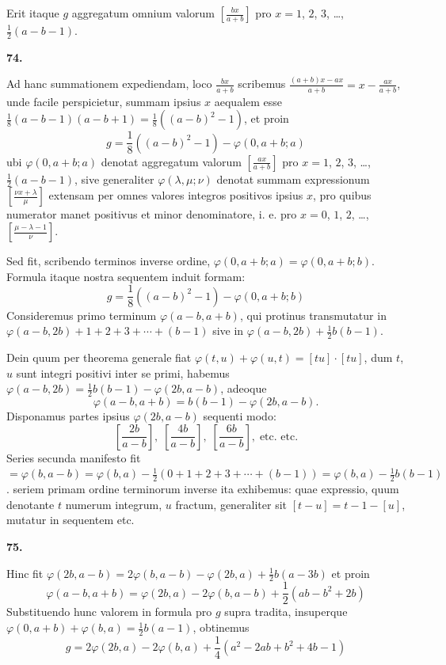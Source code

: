 \documentclass[12pt,a4paper]{article}
\theoremstyle{plain}
\theoremstyle{definition}
\theoremstyle{remark}
\begin{document}
Erit itaque $g$ aggregatum omnium valorum $\left[\frac{bx}{a+b}\right]$ pro $x = 1$, $2$, $3$, \ldots, $\frac{1}{2}(a-b-1)$.

\bigskip

\noindent\textbf{74.}

Ad hanc summationem expediendam, loco $\frac{bx}{a+b}$ scribemus $\frac{(a+b)x - ax}{a+b} = x - \frac{ax}{a+b}$, unde facile perspicietur, summam ipsius $x$ aequalem esse $\frac{1}{8}(a-b-1)(a-b+1) = \frac{1}{8}((a-b)^2 - 1)$, et proin
\[
g = \frac{1}{8}((a-b)^2 - 1) - \varphi(0, a+b; a)
\]
ubi $\varphi(0, a+b; a)$ denotat aggregatum valorum $\left[\frac{ax}{a+b}\right]$ pro $x = 1$, $2$, $3$, \ldots, $\frac{1}{2}(a-b-1)$, sive generaliter $\varphi(\lambda, \mu; \nu)$ denotat summam expressionum $\left[\frac{\nu x + \lambda}{\mu}\right]$ extensam per omnes valores integros positivos ipsius $x$, pro quibus numerator manet positivus et minor denominatore, i. e. pro $x = 0$, $1$, $2$, \ldots, $\left[\frac{\mu - \lambda - 1}{\nu}\right]$.

Sed fit, scribendo terminos inverse ordine, $\varphi(0, a+b; a) = \varphi(0, a+b; b)$. Formula itaque nostra sequentem induit formam:
\[
g = \frac{1}{8}((a-b)^2 - 1) - \varphi(0, a+b; b)
\]
Consideremus primo terminum $\varphi(a-b, a+b)$, qui protinus transmutatur in $\varphi(a-b, 2b) + 1 + 2 + 3 + \cdots + (b-1)$ sive in $\varphi(a-b, 2b) + \frac{1}{2}b(b-1)$.

Dein quum per theorema generale fiat $\varphi(t, u) + \varphi(u, t) = [tu] \cdot [tu]$, dum $t$, $u$ sunt integri positivi inter se primi, habemus $\varphi(a-b, 2b) = \frac{1}{2}b(b-1) - \varphi(2b, a-b)$, adeoque
\[
\varphi(a-b, a+b) = b(b-1) - \varphi(2b, a-b).
\]
Disponamus partes ipsius $\varphi(2b, a-b)$ sequenti modo:
\[
\left[\frac{2b}{a-b}\right],\; \left[\frac{4b}{a-b}\right],\; \left[\frac{6b}{a-b}\right],\; \text{etc. etc.}
\]
Series secunda manifesto fit $= \varphi(b, a-b) = \varphi(b, a) - \frac{1}{2}(0+1+2+3+\cdots+(b-1)) = \varphi(b, a) - \frac{1}{2}b(b-1)$. seriem primam ordine terminorum inverse ita exhibemus: quae expressio, quum denotante $t$ numerum integrum, $u$ fractum, generaliter sit $[t-u] = t-1-[u]$, mutatur in sequentem etc.

\bigskip

\noindent\textbf{75.}

Hinc fit $\varphi(2b, a-b) = 2\varphi(b, a-b) - \varphi(2b, a) + \frac{1}{2}b(a-3b)$ et proin
\[
\varphi(a-b, a+b) = \varphi(2b, a) - 2\varphi(b, a-b) + \frac{1}{2}(ab - b^2 + 2b)
\]
Substituendo hunc valorem in formula pro $g$ supra tradita, insuperque $\varphi(0, a+b) + \varphi(b, a) = \frac{1}{2}b(a-1)$, obtinemus
\[
g = 2\varphi(2b, a) - 2\varphi(b, a) + \frac{1}{4}(a^2 - 2ab + b^2 + 4b - 1)
\]
\end{document}
